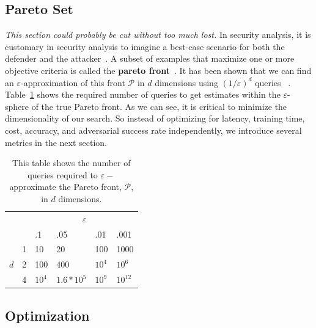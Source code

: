 \documentclass[conference]{IEEEtran}
\newcommand{\cm}[1]{\textit{{\color{blue}#1}}}
\begin{document}
\subsection{Pareto Set}
\cm{This section could probably be cut without too much lost.}
In security analysis, it is customary in security analysis to imagine a best-case scenario for both the defender and the attacker~\cite{}. A subset of examples that maximize one or more objective criteria is called the \textbf{pareto front}~\cite{zitzler2008quality}. It has been shown that we can find an $\varepsilon$-approximation of this front $\mathcal{P}$ in $d$ dimensions using $(1/ \varepsilon)^d$ queries ~\cite{legriel2010approximating}. Table~\ref{tab:pareto} shows the required number of queries to get estimates within the $\varepsilon$-sphere of the true Pareto front. As we can see, it is critical to minimize the dimensionality of our search. So instead of optimizing for latency, training time, cost, accuracy, and adversarial success rate independently, we introduce several metrics in the next section.


% 
\begin{table}[h!]
\begin{tabular}{cl|llll|}
\cline{3-6}
                                           &   & \multicolumn{4}{c|}{$\varepsilon$}            \\ \cline{3-6} 
                                           &   & .1     & .05          & .01    & .001      \\ \hline
\multicolumn{1}{|c|}{\multirow{3}{*}{$d$}} & 1 & 10     & 20           & 100    & 1000      \\
\multicolumn{1}{|c|}{}                     & 2 & 100    & 400          & $10^4$ & $10^6$    \\
\multicolumn{1}{|c|}{}                     & 4 & $10^4$ & $1.6 * 10^5$ & $10^9$ & $10^{12}$ \\ \hline
\end{tabular}
\caption{This table shows the number of queries required to $\varepsilon-$ approximate the Pareto front, $\mathcal{P}$, in $d$ dimensions.}
\label{tab:pareto}
\end{table}


\subsection{Optimization}
\end{document}
